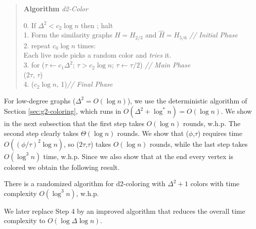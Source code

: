 \begin{quote}
   \textbf{Algorithm} \emph{d2-Color}

   0. If $\Delta^2 < c_2 \log n$ then ; halt \\
   1. Form the similarity graphs $H=H_{2/3}$ and $\hat{H} = H_{5/6}$  \hspace{1cm }\textit{// Initial Phase} \\
   2. repeat $c_0 \log n$ times: \\
   \hspace*{2em} Each live node picks a random color and \emph{tries} it. \\
   3. for ($\tau \leftarrow c_1 \Delta^2$; $\tau > c_2 \log n$; $\tau \leftarrow \tau/2$) \hspace{3.5cm }\textit{// Main Phase}\\
\hspace*{2em}      ($2 \tau$, $\tau$) \\
    4. ($c_2 \log n$, 1)\hspace{6.75cm}\textit{// Final Phase}
\end{quote}

 
For low-degree graphs ($\Delta^2 = O(\log n)$), we use the deterministic algorithm of Section \ref{sec:g2-coloring}, which runs in $O(\Delta^2 + \log^* n) = O(\log n)$.
We show in the next subsection that the first step takes $O(\log n)$ rounds, w.h.p.
The second step clearly takes $\Theta(\log n)$ rounds.
We show that ($\phi$,$\tau$) requires time $O((\phi/\tau)^2\log n)$, so ($2\tau$,$\tau$) takes $O(\log n)$ rounds, while the last step takes $O(\log^3 n)$ time, w.h.p. Since we also show that at the end every vertex is colored we obtain the following result.

\begin{corollary}
  There is a randomized {\congest} algorithm for d2-coloring with $\Delta^2+1$ colors with time complexity $O(\log^3 n)$, w.h.p.
  \label{C:first-rand-result}
\end{corollary}

We later replace Step 4 by an improved algorithm that reduces the overall time complexity to $O(\log \Delta \log n)$. 

